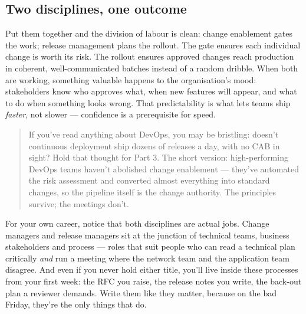 \subsection{Two disciplines, one outcome}


Put them together and the division of labour is clean: change enablement gates the work; release management plans the rollout. The gate ensures each individual change is worth its risk. The rollout ensures approved changes reach production in coherent, well-communicated batches instead of a random dribble. When both are working, something valuable happens to the organisation's mood: stakeholders know who approves what, when new features will appear, and what to do when something looks wrong. That predictability is what lets teams ship \emph{faster}, not slower — confidence is a prerequisite for speed.



\begin{quote}\small
If you've read anything about DevOps, you may be bristling: doesn't continuous deployment ship dozens of releases a day, with no CAB in sight? Hold that thought for Part 3. The short version: high-performing DevOps teams haven't abolished change enablement — they've automated the risk assessment and converted almost everything into standard changes, so the pipeline itself is the change authority. The principles survive; the meetings don't.
\end{quote}


For your own career, notice that both disciplines are actual jobs. Change managers and release managers sit at the junction of technical teams, business stakeholders and process — roles that suit people who can read a technical plan critically \emph{and} run a meeting where the network team and the application team disagree. And even if you never hold either title, you'll live inside these processes from your first week: the RFC you raise, the release notes you write, the back-out plan a reviewer demands. Write them like they matter, because on the bad Friday, they're the only things that do.

